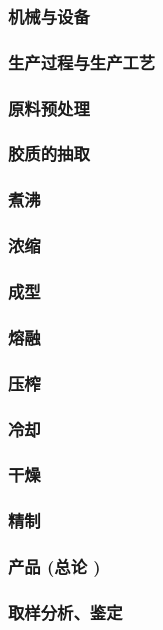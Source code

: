 \documentclass[UTF8]{../../ApplicationUniverse}
\begin{document}
    \subsubsection{机械与设备}
    \subsubsection{生产过程与生产工艺}
        \subsubsection{原料预处理}
        \subsubsection{胶质的抽取}
        \subsubsection{煮沸}
        \subsubsection{浓缩}
        \subsubsection{成型}
            \subsubsection{熔融}
            \subsubsection{压榨}
            \subsubsection{冷却}
            \subsubsection{干燥}
            \subsubsection{精制}
    \subsubsection{产品 (总论 )}
        \subsubsection{取样分析、鉴定}
\end{document}
